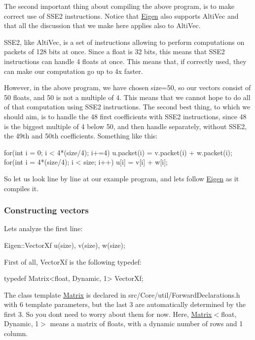 The second important thing about compiling the above program, is to make correct use of S\+S\+E2 instructions. Notice that \hyperlink{namespace_eigen}{Eigen} also supports Alti\+Vec and that all the discussion that we make here applies also to Alti\+Vec.

S\+S\+E2, like Alti\+Vec, is a set of instructions allowing to perform computations on packets of 128 bits at once. Since a float is 32 bits, this means that S\+S\+E2 instructions can handle 4 floats at once. This means that, if correctly used, they can make our computation go up to 4x faster.

However, in the above program, we have chosen size=50, so our vectors consist of 50 float\textquotesingle{}s, and 50 is not a multiple of 4. This means that we cannot hope to do all of that computation using S\+S\+E2 instructions. The second best thing, to which we should aim, is to handle the 48 first coefficients with S\+S\+E2 instructions, since 48 is the biggest multiple of 4 below 50, and then handle separately, without S\+S\+E2, the 49th and 50th coefficients. Something like this\+:


\begin{DoxyCode}
\textcolor{keywordflow}{for}(\textcolor{keywordtype}{int} i = 0; i < 4*(size/4); i+=4) u.packet(i)  = v.packet(i) + w.packet(i);
\textcolor{keywordflow}{for}(\textcolor{keywordtype}{int} i = 4*(size/4); i < size; i++) u[i] = v[i] + w[i];
\end{DoxyCode}


So let us look line by line at our example program, and let\textquotesingle{}s follow \hyperlink{namespace_eigen}{Eigen} as it compiles it.\hypertarget{_topic_inside_eigen_example_ConstructingVectors}{}\subsubsection{Constructing vectors}\label{_topic_inside_eigen_example_ConstructingVectors}
Let\textquotesingle{}s analyze the first line\+:


\begin{DoxyCode}
Eigen::VectorXf u(size), v(size), w(size);
\end{DoxyCode}


First of all, Vector\+Xf is the following typedef\+: 
\begin{DoxyCode}
\textcolor{keyword}{typedef} Matrix<float, Dynamic, 1> VectorXf;
\end{DoxyCode}


The class template \hyperlink{group___core___module_class_eigen_1_1_matrix}{Matrix} is declared in src/\+Core/util/\+Forward\+Declarations.\+h with 6 template parameters, but the last 3 are automatically determined by the first 3. So you don\textquotesingle{}t need to worry about them for now. Here, \hyperlink{group___core___module_class_eigen_1_1_matrix}{Matrix}$<$float, Dynamic, 1$>$ means a matrix of floats, with a dynamic number of rows and 1 column.

